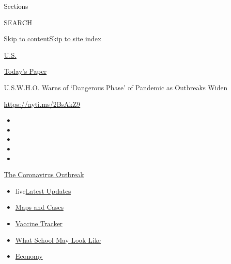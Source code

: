 Sections

SEARCH

\protect\hyperlink{site-content}{Skip to
content}\protect\hyperlink{site-index}{Skip to site index}

\href{https://www.nytimes.com/section/us}{U.S.}

\href{https://myaccount.nytimes.com/auth/login?response_type=cookie\&client_id=vi}{}

\href{https://www.nytimes.com/section/todayspaper}{Today's Paper}

\href{/section/us}{U.S.}\textbar{}W.H.O. Warns of `Dangerous Phase' of
Pandemic as Outbreaks Widen

\url{https://nyti.ms/2BsAkZ9}

\begin{itemize}
\item
\item
\item
\item
\item
\end{itemize}

\href{https://www.nytimes.com/news-event/coronavirus?action=click\&pgtype=Article\&state=default\&region=TOP_BANNER\&context=storylines_menu}{The
Coronavirus Outbreak}

\begin{itemize}
\tightlist
\item
  live\href{https://www.nytimes.com/2020/08/01/world/coronavirus-covid-19.html?action=click\&pgtype=Article\&state=default\&region=TOP_BANNER\&context=storylines_menu}{Latest
  Updates}
\item
  \href{https://www.nytimes.com/interactive/2020/us/coronavirus-us-cases.html?action=click\&pgtype=Article\&state=default\&region=TOP_BANNER\&context=storylines_menu}{Maps
  and Cases}
\item
  \href{https://www.nytimes.com/interactive/2020/science/coronavirus-vaccine-tracker.html?action=click\&pgtype=Article\&state=default\&region=TOP_BANNER\&context=storylines_menu}{Vaccine
  Tracker}
\item
  \href{https://www.nytimes.com/interactive/2020/07/29/us/schools-reopening-coronavirus.html?action=click\&pgtype=Article\&state=default\&region=TOP_BANNER\&context=storylines_menu}{What
  School May Look Like}
\item
  \href{https://www.nytimes.com/live/2020/07/31/business/stock-market-today-coronavirus?action=click\&pgtype=Article\&state=default\&region=TOP_BANNER\&context=storylines_menu}{Economy}
\end{itemize}

